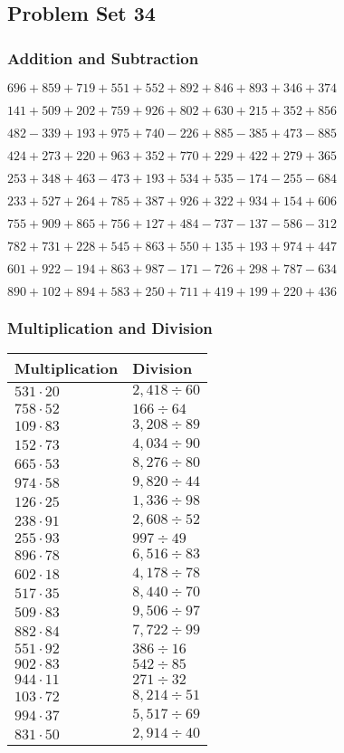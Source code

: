 \hypertarget{problem-set-34-2}{%
\subsection{Problem Set 34}\label{problem-set-34-2}}

\hypertarget{addition-and-subtraction-134}{%
\subsubsection{Addition and
Subtraction}\label{addition-and-subtraction-134}}

\(696 + 859 + 719 + 551 + 552 + 892 + 846 + 893 + 346 + 374\)

\(141 + 509 + 202 + 759 + 926 + 802 + 630 + 215 + 352 + 856\)

\(482 - 339 + 193 + 975 + 740 - 226 + 885 - 385 + 473 - 885\)

\(424 + 273 + 220 + 963 + 352 + 770 + 229 + 422 + 279 + 365\)

\(253 + 348 + 463 - 473 + 193 + 534 + 535 - 174 - 255 - 684\)

\(233 + 527 + 264 + 785 + 387 + 926 + 322 + 934 + 154 + 606\)

\(755 + 909 + 865 + 756 + 127 + 484 - 737 - 137 - 586 - 312\)

\(782 + 731 + 228 + 545 + 863 + 550 + 135 + 193 + 974 + 447\)

\(601 + 922 - 194 + 863 + 987 - 171 - 726 + 298 + 787 - 634\)

\(890 + 102 + 894 + 583 + 250 + 711 + 419 + 199 + 220 + 436\)

\hypertarget{multiplication-and-division-134}{%
\subsubsection{Multiplication and
Division}\label{multiplication-and-division-134}}

\begin{longtable}[]{@{}ll@{}}
\toprule
Multiplication & Division\tabularnewline
\midrule
\endhead
\(531 \cdot 20\) & \(2,418÷60\)\tabularnewline
\(758 \cdot 52\) & \(166÷64\)\tabularnewline
\(109 \cdot 83\) & \(3,208÷89\)\tabularnewline
\(152 \cdot 73\) & \(4,034÷90\)\tabularnewline
\(665 \cdot 53\) & \(8,276÷80\)\tabularnewline
\(974 \cdot 58\) & \(9,820÷44\)\tabularnewline
\(126 \cdot 25\) & \(1,336÷98\)\tabularnewline
\(238 \cdot 91\) & \(2,608÷52\)\tabularnewline
\(255 \cdot 93\) & \(997 ÷ 49\)\tabularnewline
\(896 \cdot 78\) & \(6,516÷83\)\tabularnewline
\(602 \cdot 18\) & \(4,178÷78\)\tabularnewline
\(517 \cdot 35\) & \(8,440÷70\)\tabularnewline
\(509 \cdot 83\) & \(9,506÷97\)\tabularnewline
\(882 \cdot 84\) & \(7,722÷99\)\tabularnewline
\(551 \cdot 92\) & \(386÷16\)\tabularnewline
\(902 \cdot 83\) & \(542÷85\)\tabularnewline
\(944 \cdot 11\) & \(271÷32\)\tabularnewline
\(103 \cdot 72\) & \(8,214÷51\)\tabularnewline
\(994 \cdot 37\) & \(5,517÷69\)\tabularnewline
\(831 \cdot 50\) & \(2,914÷40\)\tabularnewline
\bottomrule
\end{longtable}

